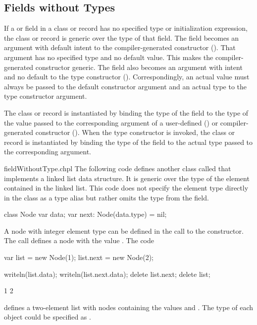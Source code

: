 \subsection{Fields without Types}
\label{Fields_without_Types}

If a  or  field in a class or record has no specified type or
initialization expression, the class or record is generic over the
type of that field.  The field becomes an argument with default intent to
the compiler-generated constructor ().
That argument has no specified type and no default
value. This makes the compiler-generated constructor generic.
The field also becomes an argument with  intent and no default
to the type constructor ().
Correspondingly, an actual value must always be passed to the default
constructor argument and an actual type to the type constructor argument.

The class or record is instantiated by binding the type of the field
to the type of the value passed to the corresponding argument
of a user-defined () or compiler-generated constructor ().
When the type constructor is invoked, the class or record is instantiated
by binding the type of the field to the actual type passed to
the corresponding argument.

\begin{chapelexample}{fieldWithoutType.chpl}
The following code defines another class called  that
implements a linked list data structure.  It is generic over the type
of the element contained in the linked list.  This code does not
specify the element type directly in the class as a type alias but
rather omits the type from the  field.
\begin{chapel}
class Node {
  var data;
  var next: Node(data.type) = nil;
}
\end{chapel}
A node with integer element type can be defined in the call to the
constructor.  The call  defines a node with the
value .  The code
\begin{chapel}
var list = new Node(1);
list.next = new Node(2);
\end{chapel}
\begin{chapelpost}
writeln(list.data);
writeln(list.next.data);
delete list.next;
delete list;
\end{chapelpost}
\begin{chapeloutput}
1
2
\end{chapeloutput}
defines a two-element list with nodes containing the values 
and .  The type of each object could be specified
as .
\end{chapelexample}

